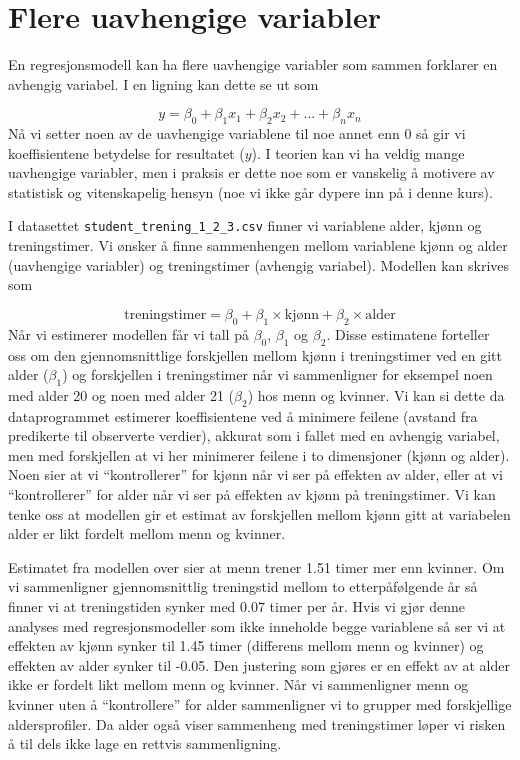 \documentclass[
  letterpaper,
  DIV=11,
  numbers=noendperiod,
  oneside]{scrreprt}
\begin{document}
\hypertarget{flere-uavhengige-variabler}{%
\section{Flere uavhengige variabler}\label{flere-uavhengige-variabler}}

En regresjonsmodell kan ha flere uavhengige variabler som sammen
forklarer en avhengig variabel. I en ligning kan dette se ut som

\[y=\beta_0 + \beta_1x_1 + \beta_2x_2 + ... + \beta_nx_n\] Nå vi setter
noen av de uavhengige variablene til noe annet enn 0 så gir vi
koeffisientene betydelse for resultatet (\(y\)). I teorien kan vi ha
veldig mange uavhengige variabler, men i praksis er dette noe som er
vanskelig å motivere av statistisk og vitenskapelig hensyn (noe vi ikke
går dypere inn på i denne kurs).

I datasettet \texttt{student\_trening\_1\_2\_3.csv} finner vi variablene
alder, kjønn og treningstimer. Vi ønsker å finne sammenhengen mellom
variablene kjønn og alder (uavhengige variabler) og treningstimer
(avhengig variabel). Modellen kan skrives som

\[\text{treningstimer} = \beta_0 + \beta_1\times\text{kjønn} + \beta_2\times\text{alder}\]
Når vi estimerer modellen får vi tall på \(\beta_0\), \(\beta_1\) og
\(\beta_2\). Disse estimatene forteller oss om den gjennomsnittlige
forskjellen mellom kjønn i treningstimer ved en gitt alder (\(\beta_1\))
og forskjellen i treningstimer når vi sammenligner for eksempel noen med
alder 20 og noen med alder 21 (\(\beta_2\)) hos menn og kvinner. Vi kan
si dette da dataprogrammet estimerer koeffisientene ved å minimere
feilene (avstand fra predikerte til observerte verdier), akkurat som i
fallet med en avhengig variabel, men med forskjellen at vi her minimerer
feilene i to dimensjoner (kjønn og alder). Noen sier at vi
``kontrollerer'' for kjønn når vi ser på effekten av alder, eller at vi
``kontrollerer'' for alder når vi ser på effekten av kjønn på
treningstimer. Vi kan tenke oss at modellen gir et estimat av
forskjellen mellom kjønn gitt at variabelen alder er likt fordelt mellom
menn og kvinner.

Estimatet fra modellen over sier at menn trener 1.51 timer mer enn
kvinner. Om vi sammenligner gjennomsnittlig treningstid mellom to
etterpåfølgende år så finner vi at treningstiden synker med 0.07 timer
per år. Hvis vi gjør denne analyses med regresjonsmodeller som ikke
inneholde begge variablene så ser vi at effekten av kjønn synker til
1.45 timer (differens mellom menn og kvinner) og effekten av alder
synker til -0.05. Den justering som gjøres er en effekt av at alder ikke
er fordelt likt mellom menn og kvinner. Når vi sammenligner menn og
kvinner uten å ``kontrollere'' for alder sammenligner vi to grupper med
forskjellige aldersprofiler. Da alder også viser sammenheng med
treningstimer løper vi risken å til dels ikke lage en rettvis
sammenligning.
\end{document}
